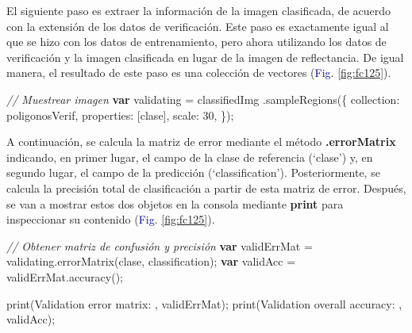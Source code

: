 \documentclass[
  12pt,
  letterpaper,
  twoside]{book}
\newenvironment{Shaded}{\begin{snugshade}}{\end{snugshade}}
\newcommand{\CommentTok}[1]{\textcolor[rgb]{0.24,0.58,0.00}{\textit{#1}}}
\newcommand{\ControlFlowTok}[1]{\textcolor[rgb]{0.00,0.00,0.00}{\textbf{#1}}}
\newcommand{\DataTypeTok}[1]{\textcolor[rgb]{0.00,0.00,0.00}{#1}}
\newcommand{\DecValTok}[1]{\textcolor[rgb]{0.28,0.53,0.93}{#1}}
\newcommand{\FunctionTok}[1]{\textcolor[rgb]{0.48,0.12,0.64}{#1}}
\newcommand{\NormalTok}[1]{#1}
\newcommand{\OperatorTok}[1]{\textcolor[rgb]{0.00,0.00,0.00}{#1}}
\newcommand{\StringTok}[1]{\textcolor[rgb]{0.87,0.29,0.22}{#1}}
\newcommand\boldpurple[1]{\textcolor{darkpurple}{\textbf{#1}}}
\begin{document}
El siguiente paso es extraer la información de la imagen clasificada, de acuerdo con la extensión de los datos de verificación. Este paso es exactamente igual al que se hizo con los datos de entrenamiento, pero ahora utilizando los datos de verificación y la imagen clasificada en lugar de la imagen de reflectancia. De igual manera, el resultado de este paso es una colección de vectores (\textcolor{darkblue}{Fig.} \ref{fig:fc125}).

\begin{Shaded}
\begin{Highlighting}[]
\CommentTok{// Muestrear imagen}
\ControlFlowTok{var}\NormalTok{ validating }\OperatorTok{=}\NormalTok{ classifiedImg}
  \OperatorTok{.}\FunctionTok{sampleRegions}\NormalTok{(\{}
  \DataTypeTok{collection}\OperatorTok{:}\NormalTok{ poligonosVerif}\OperatorTok{,}
  \DataTypeTok{properties}\OperatorTok{:}\NormalTok{ [}\StringTok{\textquotesingle{}clase\textquotesingle{}}\NormalTok{]}\OperatorTok{,}
  \DataTypeTok{scale}\OperatorTok{:} \DecValTok{30}\OperatorTok{,}
\NormalTok{\})}\OperatorTok{;}
\end{Highlighting}
\end{Shaded}

A continuación, se calcula la matriz de error mediante el método \boldpurple{.errorMatrix} indicando, en primer lugar, el campo de la clase de referencia (`clase') y, en segundo lugar, el campo de la predicción (`classification'). Posteriormente, se calcula la precisión total de clasificación a partir de esta matriz de error. Después, se van a mostrar estos dos objetos en la consola mediante \boldpurple{print} para inspeccionar su contenido (\textcolor{darkblue}{Fig.} \ref{fig:fc125}).

\begin{Shaded}
\begin{Highlighting}[]
\CommentTok{// Obtener matriz de confusión y precisión}
\ControlFlowTok{var}\NormalTok{ validErrMat }\OperatorTok{=}\NormalTok{ validating}\OperatorTok{.}\FunctionTok{errorMatrix}\NormalTok{(}\StringTok{\textquotesingle{}clase\textquotesingle{}}\OperatorTok{,} \StringTok{\textquotesingle{}classification\textquotesingle{}}\NormalTok{)}\OperatorTok{;}
\ControlFlowTok{var}\NormalTok{ validAcc }\OperatorTok{=}\NormalTok{ validErrMat}\OperatorTok{.}\FunctionTok{accuracy}\NormalTok{()}\OperatorTok{;}

\FunctionTok{print}\NormalTok{(}\StringTok{\textquotesingle{}Validation error matrix: \textquotesingle{}}\OperatorTok{,}\NormalTok{ validErrMat)}\OperatorTok{;}
\FunctionTok{print}\NormalTok{(}\StringTok{\textquotesingle{}Validation overall accuracy: \textquotesingle{}}\OperatorTok{,}\NormalTok{ validAcc)}\OperatorTok{;}
\end{Highlighting}
\end{Shaded}
\end{document}
